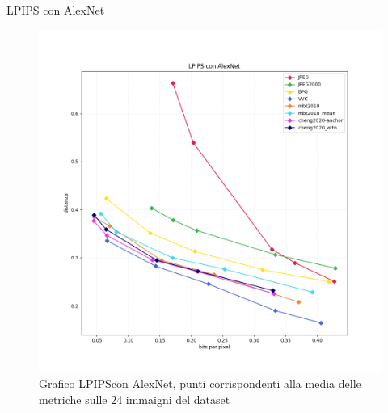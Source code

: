     \begin{frame}{LPIPS con AlexNet}
        \begin{figure}[t!]
            \centering
            \includegraphics[width=0.57\textheight]{Immagini/METRICS/LPIPS.png}
            \caption{Grafico LPIPS\footnotemark[1] con AlexNet, punti corrispondenti alla media delle metriche sulle 24 immaigni del dataset}
            \label{fig:GraphLPIPS}
        \end{figure}
    \end{frame}
    
    
